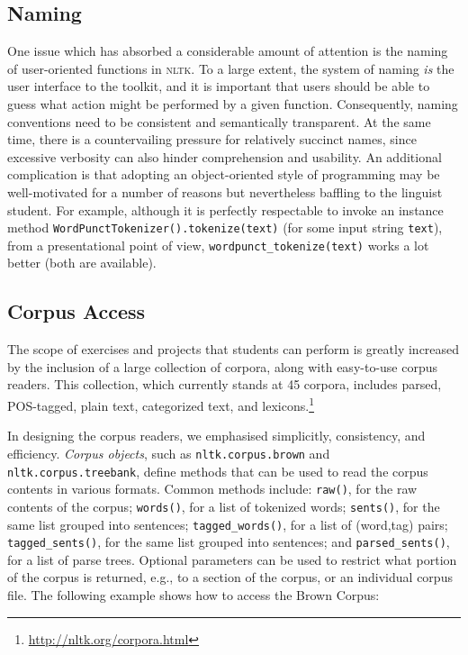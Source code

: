 \documentclass[11pt]{article}
\newcommand{\NLTK}{\textsc{nltk}}
\newcommand{\code}[1]{\texttt{\small #1}}
\begin{document}
\subsection{Naming}

One issue which has absorbed a considerable amount of attention is the
naming of user-oriented functions in \NLTK. To a large extent, the
system of naming \emph{is} the user interface to the toolkit, and it is
important that users should be able to guess what action might be
performed by a given function. Consequently, naming conventions need
to be consistent and semantically transparent. At the same time, there is a
countervailing pressure for relatively succinct names, since excessive verbosity
can also hinder comprehension and usability. An additional
complication is that adopting an object-oriented style of programming
may be well-motivated for a number of reasons but nevertheless
baffling to the linguist student. For example, although it is
perfectly respectable to invoke an instance method
\code{WordPunctTokenizer().tokenize(text)} (for some input
string \code{text}), from a presentational point of view, 
\code{wordpunct\_tokenize(text)} works a lot better
(both are available).


\subsection{Corpus Access}

The scope of exercises and projects that students can perform is
greatly increased by the inclusion of a large collection of corpora,
along with easy-to-use corpus readers.  This collection, which
currently stands at 45 corpora, includes parsed, POS-tagged, plain
text, categorized text, and
lexicons.\footnote{\url{http://nltk.org/corpora.html}}

In designing the corpus readers, we emphasised simplicitly,
consistency, and efficiency.  \emph{Corpus objects}, such as
\code{nltk.corpus.brown} and \code{nltk.corpus.treebank}, define
methods that can be used to read the corpus contents in various
formats.  Common methods include:
%
\code{raw()}, for the raw contents of the corpus;
\code{words()}, for a list of tokenized words;
\code{sents()}, for the same list grouped into sentences;
\code{tagged\_words()}, for a list of (word,tag) pairs;
\code{tagged\_sents()}, for the same list grouped into sentences;
and
\code{parsed\_sents()}, for a list of parse trees.
%
Optional parameters can be used to restrict what portion of the corpus
is returned, e.g., to a section of the corpus, or an individual corpus
file.
The following example shows how to access the Brown Corpus:
\end{document}
